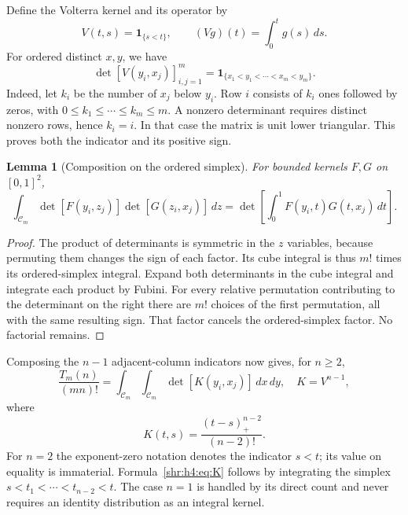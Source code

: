 \documentclass[11pt,letterpaper]{article}
\numberwithin{equation}{section}
\newtheorem{lemma}[theorem]{Lemma}
\theoremstyle{definition}
\newcommand{\1}{\mathbf 1}
\newcommand{\one}{\mathbf1}
\newcommand{\dd}{\,d}
\begin{document}
Define the Volterra kernel and its operator by
\[
 V(t,s)=\one_{\{s<t\}},\qquad (Vg)(t)=\int_0^t g(s)\dd s.
\]
For ordered distinct $x,y$, we have
\begin{equation}
 \det[V(y_i,x_j)]_{i,j=1}^m
 =\one_{\{x_1<y_1<\cdots<x_m<y_m\}}.
 \label{shr:h4:eq:indicator}
\end{equation}
Indeed, let $k_i$ be the number of $x_j$ below $y_i$. Row $i$ consists of
$k_i$ ones followed by zeros, with $0\le k_1\le\cdots\le k_m\le m$.
A nonzero determinant requires distinct nonzero rows, hence $k_i=i$.
In that case the matrix is unit lower triangular. This proves both the
indicator and its positive sign.

\begin{lemma}[Composition on the ordered simplex]
\label{shr:h4:lem:andreief}
For bounded kernels $F,G$ on $[0,1]^2$,
\begin{equation}
 \int_{\mathcal C_m}
 \det[F(y_i,z_j)]\det[G(z_i,x_j)]\dd z
 =\det\left[\int_0^1F(y_i,t)G(t,x_j)\dd t\right].
 \label{shr:h4:eq:andreief}
\end{equation}
\end{lemma}
\begin{proof}
The product of determinants is symmetric in the $z$ variables, because
permuting them changes the sign of each factor. Its cube integral is thus
$m!$ times its ordered-simplex integral. Expand both determinants in the
cube integral and integrate each product by Fubini. For every relative
permutation contributing to the determinant on the right there are $m!$
choices of the first permutation, all with the same resulting sign.
That factor cancels the ordered-simplex factor. No factorial remains.
\end{proof}

Composing the $n-1$ adjacent-column indicators now gives, for $n\ge2$,
\begin{equation}
 \frac{T_m(n)}{(mn)!}
 =\int_{\mathcal C_m}\int_{\mathcal C_m}
       \det[K(y_i,x_j)]\dd x\dd y,
 \quad K=V^{n-1},
 \label{shr:h4:eq:transfer}
\end{equation}
where
\begin{equation}
 K(t,s)=\frac{(t-s)_+^{n-2}}{(n-2)!}.
 \label{shr:h4:eq:K}
\end{equation}
For $n=2$ the exponent-zero notation denotes the indicator $s<t$;
its value on equality is immaterial. Formula~\eqref{shr:h4:eq:K} follows by
integrating the simplex $s<t_1<\cdots<t_{n-2}<t$. The case $n=1$ is
handled by its direct count and never requires an identity distribution
as an integral kernel.
\end{document}
